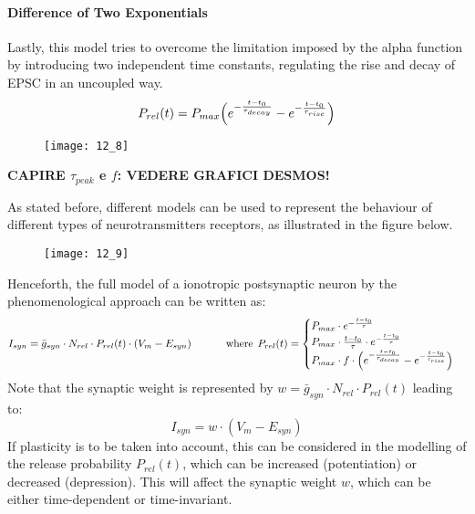 \paragraph{Difference of Two Exponentials}
Lastly, this model tries to overcome the limitation imposed by the alpha function
by introducing two independent time constants, regulating the rise and
decay of EPSC in an uncoupled way.
\begin{equation*}
    P_{rel}(t)=P_{max}\Bigl(e^{-\frac{t-t_{0}}{\tau_{decay}}}-e^{-\frac{t-t_{0}}{\tau_{rise}}}\Bigr)
\end{equation*}
\begin{figure}[H]
    \texttt{[image: 12\_8]}
    \centering
\end{figure}
\textbf{CAPIRE \(\tau_{peak}\) e \(f\): VEDERE GRAFICI DESMOS!}
\par
As stated before, different models can be used to represent the behaviour of different types of
neurotransmitters receptors, as illustrated in the figure below.
\begin{figure}[H]
    \texttt{[image: 12\_9]}
    \centering
\end{figure}
Henceforth, the full model of a ionotropic postsynaptic neuron by the phenomenological
approach can be written as:
\begin{equation*}
    I_{syn}=\bar{g}_{syn}\cdot{N_{rel}}\cdot{P_{rel}(t)}\cdot{(V_{m}-E_{syn})}
    \hspace{1.15cm}
    \text{where}
    \hspace{0.15cm}
    P_{rel}(t)=
    \begin{cases}
        P_{max}\cdot{e^{-\frac{t-t_{0}}{\tau}}}\\
        P_{max}\cdot\frac{t-t_{0}}{\tau}\cdot{e^{-\frac{t-t_{0}}{\tau}}}\\
        P_{max}\cdot{f}\cdot\Bigl(e^{-\frac{t-t_{0}}{\tau_{decay}}}-e^{-\frac{t-t_{0}}{\tau_{rise}}}\Bigr)
    \end{cases}
\end{equation*}
Note that the synaptic weight is represented by
\(
    w=\bar{g}_{syn}\cdot{N_{rel}}\cdot{P_{rel}(t)}
\)
leading to:
\begin{equation*}
    I_{syn}=w\cdot{(V_{m}-E_{syn})}
\end{equation*}
If plasticity is to be taken into account, this can be considered in the modelling of the
release probability \(P_{rel}(t)\), which can be increased (potentiation) or decreased
(depression). This will affect the synaptic weight \(w\), which can be either
time-dependent or time-invariant.
